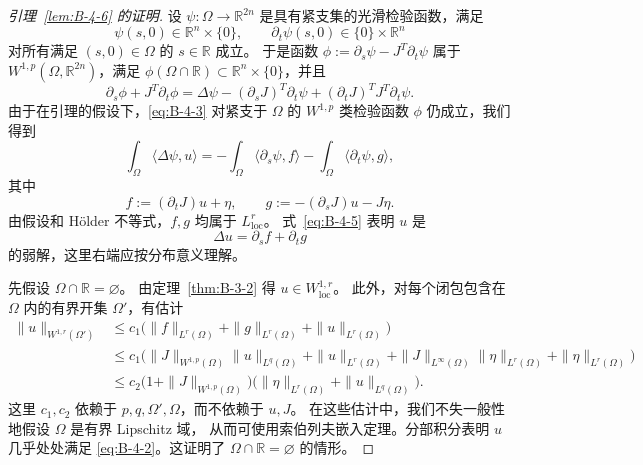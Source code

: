 \begin{proof}[引理~\ref{lem:B-4-6} 的证明]
设 $\psi:\Omega\to\mathbb R^{2n}$ 是具有紧支集的光滑检验函数，满足
\begin{equation}\label{eq:B-4-4}
  \psi(s,0)\in\mathbb R^n\times\{0\},\qquad
  \partial_t\psi(s,0)\in\{0\}\times\mathbb R^n
\end{equation}
对所有满足 $(s,0)\in\Omega$ 的 $s\in\mathbb R$ 成立。
于是函数 $\phi:=\partial_s\psi-J^T\partial_t\psi$ 属于
$W^{1,p}(\Omega,\mathbb R^{2n})$，满足
$\phi(\Omega\cap\mathbb R)\subset\mathbb R^n\times\{0\}$，并且
\[
  \partial_s\phi+J^T\partial_t\phi
  =\Delta\psi-(\partial_sJ)^T\partial_t\psi
  +(\partial_tJ)^TJ^T\partial_t\psi.
\]
由于在引理的假设下，\eqref{eq:B-4-3} 对紧支于 $\Omega$ 的
$W^{1,p}$ 类检验函数 $\phi$ 仍成立，我们得到
\begin{equation}\label{eq:B-4-5}
  \int_\Omega\langle\Delta\psi,u\rangle
  =-\int_\Omega\langle\partial_s\psi,f\rangle
   -\int_\Omega\langle\partial_t\psi,g\rangle,
\end{equation}
其中
\begin{equation}\label{eq:B-4-6}
  f:=(\partial_tJ)u+\eta,\qquad
  g:=-(\partial_sJ)u-J\eta.
\end{equation}
由假设和 Hölder 不等式，$f,g$ 均属于 $L^r_{\mathrm{loc}}$。
式~\eqref{eq:B-4-5} 表明 $u$ 是
\[
  \Delta u=\partial_sf+\partial_tg
\]
的弱解，这里右端应按分布意义理解。

先假设 $\Omega\cap\mathbb R=\varnothing$。
由定理~\ref{thm:B-3-2} 得 $u\in W^{1,r}_{\mathrm{loc}}$。
此外，对每个闭包包含在 $\Omega$ 内的有界开集 $\Omega'$，有估计
\begin{align*}
  \|u\|_{W^{1,r}(\Omega')}
  &\le c_1\bigl(\|f\|_{L^r(\Omega)}+\|g\|_{L^r(\Omega)}
       +\|u\|_{L^r(\Omega)}\bigr)\\
  &\le c_1\bigl(\|J\|_{W^{1,p}(\Omega)}\|u\|_{L^q(\Omega)}
       +\|u\|_{L^r(\Omega)}
       +\|J\|_{L^\infty(\Omega)}\|\eta\|_{L^r(\Omega)}
       +\|\eta\|_{L^r(\Omega)}\bigr)\\
  &\le c_2\bigl(1+\|J\|_{W^{1,p}(\Omega)}\bigr)
       \bigl(\|\eta\|_{L^r(\Omega)}+\|u\|_{L^q(\Omega)}\bigr).
\end{align*}
这里 $c_1,c_2$ 依赖于 $p,q,\Omega',\Omega$，而不依赖于 $u,J$。
在这些估计中，我们不失一般性地假设 $\Omega$ 是有界 Lipschitz 域，
从而可使用索伯列夫嵌入定理。分部积分表明 $u$ 几乎处处满足
\eqref{eq:B-4-2}。这证明了 $\Omega\cap\mathbb R=\varnothing$ 的情形。


\end{proof}

